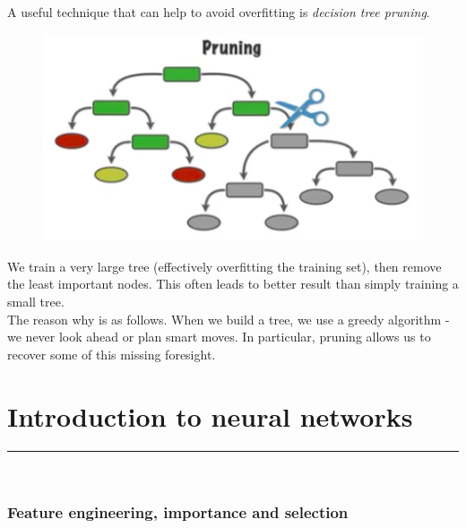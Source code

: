A useful technique that can help to avoid overfitting is \textit{decision tree pruning}. 
\begin{figure}[H]
\centering
\includegraphics[scale=0.4]{pruning.png}
\end{figure}
We train a very large tree (effectively overfitting the training set), then remove the least important nodes. This often leads to better result than simply training a small tree.\\

The reason why is as follows. When we build a tree, we use a greedy algorithm - we never look ahead or plan smart moves. In particular, pruning allows us to recover some of this missing foresight.









\newpage
\part{Introduction to neural networks}
\hrule
\noindent \\
\section{Feature engineering, importance and selection}


